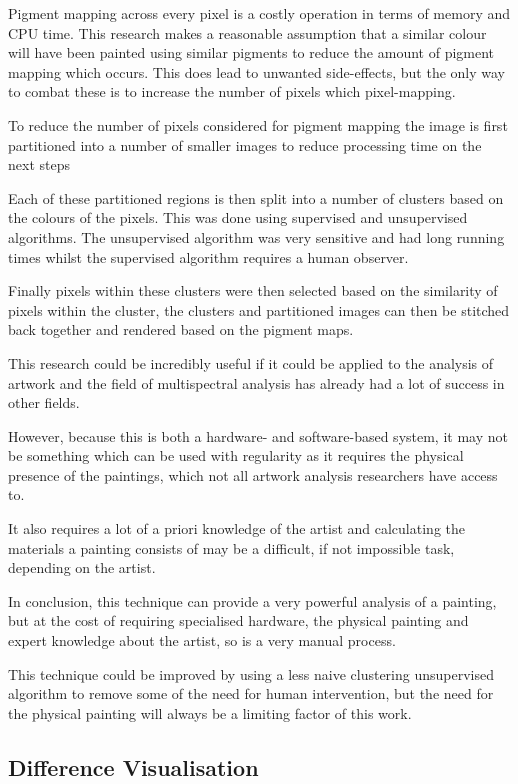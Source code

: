 \documentclass[conference]{IEEEtran}
\begin{document}
Pigment mapping across every pixel is a costly operation in terms of memory and
CPU time. This research makes a reasonable assumption that a similar colour
will have been painted using similar pigments to reduce the amount of pigment
mapping which occurs. This does lead to unwanted side-effects, but the only way
to combat these is to increase the number of pixels which pixel-mapping.

To reduce the number of pixels considered for pigment mapping the image is
first partitioned into a number of smaller images to reduce processing time on
the next steps

Each of these partitioned regions is then split into a number of clusters based
on the colours of the pixels. This was done using supervised and unsupervised
algorithms. The unsupervised algorithm was very sensitive and had long running
times whilst the supervised algorithm requires a human observer.

Finally pixels within these clusters were then selected based on the similarity
of pixels within the cluster, the clusters and partitioned images can then be
stitched back together and rendered based on the pigment maps.

This research could be incredibly useful if it could be applied to the analysis
of artwork and the field of multispectral analysis has already had a lot of
success in other fields.

However, because this is both a hardware- and software-based system, it may not
be something which can be used with regularity as it requires the physical
presence of the paintings, which not all artwork analysis researchers have
access to.

It also requires a lot of a priori knowledge of the artist and calculating the
materials a painting consists of may be a difficult, if not impossible task,
depending on the artist.

In conclusion, this technique can provide a very powerful analysis of a
painting, but at the cost of requiring specialised hardware, the physical
painting and expert knowledge about the artist, so is a very manual process.

This technique could be improved by using a less naive clustering unsupervised
algorithm to remove some of the need for human intervention, but the need for
the physical painting will always be a limiting factor of this work.

\subsection{Difference Visualisation}
\end{document}

